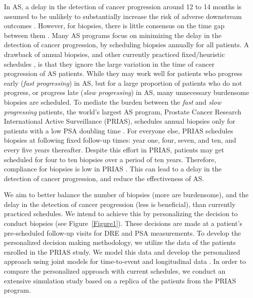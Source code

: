 \documentclass[Afour,sagev,times]{sagej}
\begin{document}
In AS, a delay in the detection of cancer progression around 12 to 14 months is assumed to be unlikely to substantially increase the risk of adverse downstream outcomes \cite{inoue2018comparative,carvalho}. However, for biopsies, there is little consensus on the time gap between them \cite{loeb2014heterogeneity,bruinsma2016active,nieboer2018active}. Many AS programs focus on minimizing the delay in the detection of cancer progression, by scheduling biopsies annually for all patients. A drawback of annual biopsies, and other currently practiced fixed/heuristic schedules \cite{loeb2014heterogeneity,bruinsma2016active,nieboer2018active}, is that they ignore the large variation in the time of cancer progression of AS patients. While they may work well for patients who progress early (\textit{fast progressing}) in AS, but for a large proportion of patients who do not progress, or progress late (\textit{slow progressing}) in AS, many unnecessary burdensome biopsies are scheduled. To mediate the burden between the \textit{fast} and \textit{slow progressing} patients, the world's largest AS program, Prostate Cancer Research International Active Surveillance\cite{bokhorst2016decade} (PRIAS), schedules annual biopsies only for patients with a low PSA doubling time \cite{bokhorst2015compliance}. For everyone else, PRIAS schedules biopsies at following fixed follow-up times: year one, four, seven, and ten, and every five years thereafter. Despite this effort in PRIAS, patients may get scheduled for four to ten biopsies over a period of ten years. Therefore, compliance for biopsies is low in PRIAS \cite{bokhorst2015compliance}. This can lead to a delay in the detection of cancer progression, and reduce the effectiveness of AS.

We aim to better balance the number of biopsies (more are burdensome), and the delay in the detection of cancer progression (less is beneficial), than currently practiced schedules. We intend to achieve this by personalizing the decision to conduct biopsies (see Figure~\ref{Figure1}). These decisions are made at a patient's pre-scheduled follow-up visits for DRE and PSA measurements. To develop the personalized decision making methodology, we utilize the data of the patients enrolled in the PRIAS study. We model this data and develop the personalized approach using joint models for time-to-event and longitudinal data \cite{tsiatis2004joint,rizopoulos2012joint}. In order to compare the personalized approach with current schedules, we conduct an extensive simulation study based on a replica of the patients from the PRIAS program. 
\end{document}
